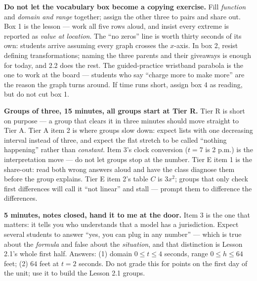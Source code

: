 \documentclass[10pt]{article}
\begin{document}
\boxguard[18]
\begin{teachernote}
    \textbf{Do not let the vocabulary box become a copying exercise.} Fill \emph{function} and
    \emph{domain and range} together; assign the other three to pairs and share out. Box 1 is the
    lesson --- work all five rows aloud, and insist every extreme is reported as \emph{value at
    location}. The ``no zeros'' line is worth thirty seconds of its own: students arrive assuming
    every graph crosses the $x$-axis. In box 2, resist defining transformations; naming the three
    parents and their giveaways is enough for today, and 2.2 does the rest. The guided-practice
    wristband parabola is the one to work at the board --- students who say ``charge more to make
    more'' are the reason the graph turns around. If time runs short, assign box 4 as reading, but
    do not cut box 1.
\end{teachernote}

\boxguard[18]
\begin{teachernote}
    \textbf{Groups of three, 15 minutes, all groups start at Tier R.} Tier R is short on purpose
    --- a group that clears it in three minutes should move straight to Tier A. Tier A item 2 is
    where groups slow down: expect lists with one decreasing interval instead of three, and expect
    the flat stretch to be called ``nothing happening'' rather than \emph{constant}. Item 3's
    clock conversion ($t=7$ is 2 p.m.) is the interpretation move --- do not let groups stop at
    the number. Tier E item 1 is the share-out: read both wrong answers aloud and have the class
    diagnose them before the group explains. Tier E item 2's table $C$ is $3x^2$; groups that only
    check first differences will call it ``not linear'' and stall --- prompt them to difference the
    differences.
\end{teachernote}

\boxguard[18]
\begin{teachernote}
    \textbf{5 minutes, notes closed, hand it to me at the door.} Item 3 is the one that matters:
    it tells you who understands that a model has a jurisdiction. Expect several students to
    answer ``yes, you can plug in any number'' --- which is true about the \emph{formula} and false
    about the \emph{situation}, and that distinction is Lesson 2.1's whole first half. Answers:
    (1) domain $0 \le t \le 4$ seconds, range $0 \le h \le 64$ feet; (2) $64$ feet at $t=2$
    seconds. Do not grade this for points on the first day of the unit; use it to build the
    Lesson 2.1 groups.
\end{teachernote}
\end{document}
